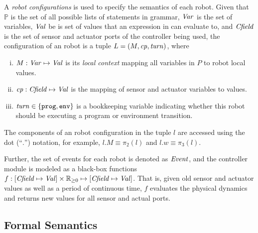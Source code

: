 A \emph{robot configurations} is used to specify the semantics of each robot.
Given that $\mathbb{P}$ is the set of all possible lists of statements in \lgname grammar,
$\mathit{Var}$ is the set of variables, $\mathit{Val}$ be is set of values that an expression in \lgname can evaluate to,
and $\mathit{Cfield}$ is the set of sensor and actuator ports of the controller being used,
the configuration of an robot is a tuple $L = ({M},\mathit{cp},\mathit{turn})$, where

\begin{enumerate}[i)]
\item ${M} : \mathit{Var} \mapsto \mathit{Val}$ is its \emph{local context} mapping all variables in $P$ to robot local values.
\item $\mathit{cp} : \mathit{Cfield} \mapsto \mathit{Val}$ is the mapping of sensor and actuator variables to values.
\item $\mathit{turn} \in \{\mathtt{prog},\mathtt{env}\}$ is a bookkeeping variable indicating whether this robot should be executing a program or environment transition.
\end{enumerate}
The components of an robot configuration in the tuple $l$ are accessed
using the dot (``$.$'') notation, for example, $l.M\equiv \pi_2(l)$ and $l.w \equiv \pi_3(l)$.

Further, the set of events for each robot is denoted as $\mathit{Event}$,
and the controller module is modeled as a black-box functions
$f: [\Cfield \mapsto \Val] \times \nnreals \mapsto [\Cfield \mapsto \Val]$.
That is, given old sensor and actuator values as well as a period of continuous time,
$f$ evaluates the physical dynamics and returns new values for all sensor and actual ports.


\subsection{Formal Semantics}\label{sec:semantics}

\newcommand{\SelectEventRule}{\textsc{SelectEvent}\xspace}
\newcommand{\EndEventRule}{\textsc{EndEvent}\xspace}
\newcommand{\ProgTransRule}{\textsc{ProgTrans}\xspace}
\newcommand{\RobotEnvTransRule}{\textsc{RobotEnvTrans}\xspace}
\newcommand{\EnvTransRule}{\textsc{EnvTrans}\xspace}
\newcommand{\RobotEnvToProgRule}{\textsc{RobotEnvToProg}\xspace}
\newcommand{\EnvToProgRule}{\textsc{EnvToProg}\xspace}
\newcommand{\exprule}{\rightarrow_E\xspace}
\newcommand{\stmtrule}{\rightarrow_\mathit{stmt}\xspace}
\newcommand{\sysrule}{\rightarrow_\mathit{Env}\xspace}
\newcommand{\progtrans}{\rightarrow_\mathit{prog}\xspace}
\newcommand{\envtrans}{\rightarrow_\mathit{env}\xspace}
\newcommand{\SelectEvent}{\ensuremath{\mathtt{\oplus}}\xspace}
\newcommand{\EndEvent}{\ensuremath{\mathtt{\cdot}}\xspace}

